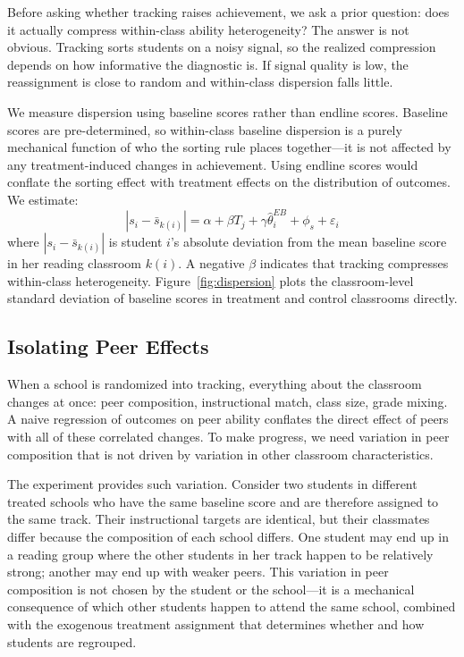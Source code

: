\documentclass[11pt]{article}
\begin{document}
Before asking whether tracking raises achievement, we ask a prior question: does it actually compress within-class ability heterogeneity? The answer is not obvious. Tracking sorts students on a noisy signal, so the realized compression depends on how informative the diagnostic is. If signal quality is low, the reassignment is close to random and within-class dispersion falls little.

We measure dispersion using baseline scores rather than endline scores. Baseline scores are pre-determined, so within-class baseline dispersion is a purely mechanical function of who the sorting rule places together---it is not affected by any treatment-induced changes in achievement. Using endline scores would conflate the sorting effect with treatment effects on the distribution of outcomes. We estimate:
\begin{equation}
|s_i - \bar{s}_{k(i)}| = \alpha + \beta T_j + \gamma \hat{\theta}^{EB}_i + \phi_s + \varepsilon_i
\end{equation}
where $|s_i - \bar{s}_{k(i)}|$ is student $i$'s absolute deviation from the mean baseline score in her reading classroom $k(i)$. A negative $\beta$ indicates that tracking compresses within-class heterogeneity. Figure~\ref{fig:dispersion} plots the classroom-level standard deviation of baseline scores in treatment and control classrooms directly.

\subsection{Isolating Peer Effects}
\label{sec:bh}

When a school is randomized into tracking, everything about the classroom changes at once: peer composition, instructional match, class size, grade mixing. A naive regression of outcomes on peer ability conflates the direct effect of peers with all of these correlated changes. To make progress, we need variation in peer composition that is not driven by variation in other classroom characteristics.

The experiment provides such variation. Consider two students in different treated schools who have the same baseline score and are therefore assigned to the same track. Their instructional targets are identical, but their classmates differ because the composition of each school differs. One student may end up in a reading group where the other students in her track happen to be relatively strong; another may end up with weaker peers. This variation in peer composition is not chosen by the student or the school---it is a mechanical consequence of which other students happen to attend the same school, combined with the exogenous treatment assignment that determines whether and how students are regrouped.
\end{document}
